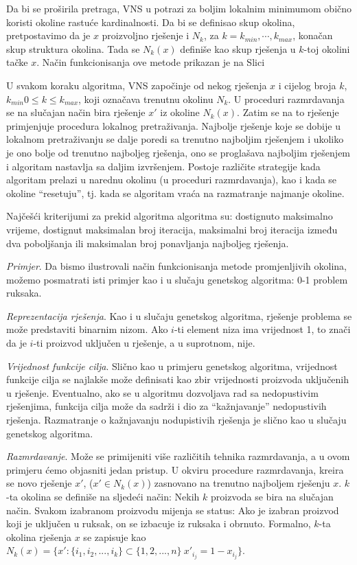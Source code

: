 \documentclass[a4paper, utf8, 11pt, colorlinks]{book}
\begin{document}
Da bi se proširila pretraga,  VNS u potrazi za boljim lokalnim minimumom obično koristi okoline rastuće kardinalnosti. Da bi se definisao skup okolina, pretpostavimo da je $x$ proizvoljno rješenje i $N_k$, za $k=k_{min},\cdots,k_{max}$, konačan skup struktura okolina. Tada se  $N_k(x)$ definiše kao skup rješenja u $k$-toj okolini tačke $x$. 
Način funkcionisanja ove metode prikazan je na Slici


U svakom koraku algoritma, VNS započinje od nekog rješenja $x$ i cijelog broja $k$, $k_{min}0\leqslant k\leqslant k_{max}$, koji označava trenutnu okolinu $N_k$. U proceduri razmrdavanja
se na slučajan način bira rješenje  $x'$ iz okoline  $N_k(x)$. Zatim se na to rješenje primjenjuje procedura lokalnog pretraživanja. Najbolje rješenje koje se dobije u lokalnom pretraživanju se dalje poredi sa trenutno najboljim rješenjem i ukoliko je ono bolje od trenutno najboljeg rješenja, ono se proglašava najboljim rješenjem i algoritam nastavlja sa daljim izvršenjem. Postoje različite strategije kada algoritam prelazi u narednu okolinu (u proceduri razmrdavanja), kao i kada se okoline ``resetuju'', tj. kada se algoritam vraća na razmatranje najmanje okoline. 

Najčešći kriterijumi za prekid algoritma algoritma su: dostignuto maksimalno  vrijeme, dostignut maksimalan broj iteracija, maksimalni broj iteracija između dva poboljšanja ili maksimalan broj ponavljanja najboljeg rješenja.

\emph{Primjer}. Da bismo ilustrovali način funkcionisanja metode promjenljivih okolina, možemo posmatrati isti primjer kao i u slučaju genetskog algoritma: 0-1 problem ruksaka. 


\emph{Reprezentacija rješenja}. Kao i u slučaju genetskog algoritma, rješenje problema se može predstaviti binarnim nizom. Ako $i$-ti element niza ima vrijednost 1, to znači da je $i$-ti proizvod uključen u rješenje, a u suprotnom, nije.

\emph{Vrijednost funkcije cilja}. Slično kao u primjeru genetskog algoritma, vrijednost funkcije cilja se najlakše može definisati kao zbir vrijednosti proizvoda uključenih u rješenje. Eventualno, ako se u algoritmu dozvoljava rad sa nedopustivim rješenjima, funkcija cilja može da sadrži i dio za ``kažnjavanje'' nedopustivih rješenja. Razmatranje o kažnjavanju nodupistivih rješenja je slično kao u slučaju genetskog algoritma.

\emph{Razmrdavanje}. Može se primijeniti više različitih tehnika razmrdavanja, a u ovom primjeru ćemo objasniti jedan pristup. 
U okviru procedure razmrdavanja, kreira se novo rješenje $x'$, ($x' \in N_k(x)$) zasno\-vano na trenutno najboljem rješenju  $x$.
$k$-ta okolina se definiše na sljedeći način: Nekih $k$ proizvoda se bira na slučajan način. Svakom izabranom proizvodu mijenja se status: Ako je izabran proizvod koji je uključen u ruksak, on se izbacuje iz ruksaka i obrnuto. Formalno, $k$-ta okolina rješenja
$x$ se zapisuje kao  $N_k(x) = \{x':  \{i_1,i_2,...,i_k\}\subset \{1,2,...,n\}\  x'_{i_j}=1-x_{i_j}\}$.
\end{document}
